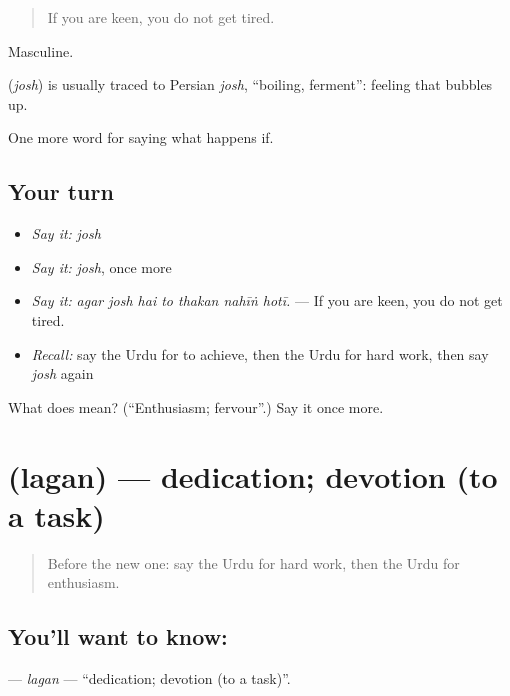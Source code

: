 \begin{quote}
If you are keen, you do not get tired.
\end{quote}

Masculine.

\begin{cousinweb}
\textbf{} (\emph{josh}) is usually traced to Persian \emph{josh}, \textquotedblleft{}boiling, ferment\textquotedblright{}: feeling that bubbles up.
\end{cousinweb}

\begin{grammarlens}[title={What you've built}]
One more word for saying what happens if.
\end{grammarlens}

\subsection*{Your turn}
\begin{itemize}
\raggedright
  \item \emph{Say it:} \emph{josh}
  \item \emph{Say it:} \emph{josh}, once more
  \item \emph{Say it:} \emph{agar josh hai to thakan nahīṅ hotī.} — If you are keen, you do not get tired.
  \item \emph{Recall:} say the Urdu for to achieve, then the Urdu for hard work, then say \emph{josh} again
\end{itemize}

\begin{tcolorbox}[breakable,colback=teal!4,colframe=teal!35!black,title={Before you move on}]
What does  mean? (\textquotedblleft{}Enthusiasm; fervour\textquotedblright{}.) Say it once more.
\end{tcolorbox}
\section[\texorpdfstring{\ur{لگن} (lagan)}{لگن (lagan)}]{ (lagan) — dedication; devotion (to a task)}

\label{lesson:UR-C379-lagan}



\begin{quote}
Before the new one: say the Urdu for hard work, then the Urdu for enthusiasm.
\end{quote}

\subsection*{You'll want to know: }
\textbf{} — \emph{lagan} — \textquotedblleft{}dedication; devotion (to a task)\textquotedblright{}.


